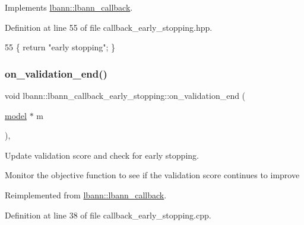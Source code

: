 Implements \hyperlink{classlbann_1_1lbann__callback_a7522c7a14f1d6a1ea762cc2d7248eb3a}{lbann\+::lbann\+\_\+callback}.



Definition at line 55 of file callback\+\_\+early\+\_\+stopping.\+hpp.


\begin{DoxyCode}
55 \{ \textcolor{keywordflow}{return} \textcolor{stringliteral}{"early stopping"}; \}
\end{DoxyCode}
\mbox{\label{classlbann_1_1lbann__callback__early__stopping_a32eb9c5e763c97ab1162cfebea7ad049}} 
\subsubsection{\texorpdfstring{on\+\_\+validation\+\_\+end()}{on\_validation\_end()}}
{\footnotesize\ttfamily void lbann\+::lbann\+\_\+callback\+\_\+early\+\_\+stopping\+::on\+\_\+validation\+\_\+end (\begin{DoxyParamCaption}\item[{\hyperlink{classlbann_1_1model}{model} $\ast$}]{m }\end{DoxyParamCaption})\hspace{0.3cm}{\ttfamily [override]}, {\ttfamily [virtual]}}

Update validation score and check for early stopping.

Monitor the objective function to see if the validation score continues to improve 

Reimplemented from \hyperlink{classlbann_1_1lbann__callback_adc16e42e5064dc2dc8d84dfbfc1325eb}{lbann\+::lbann\+\_\+callback}.



Definition at line 38 of file callback\+\_\+early\+\_\+stopping.\+cpp.


